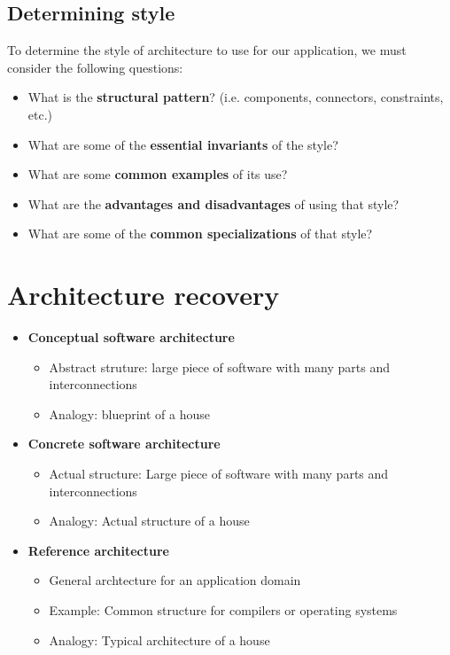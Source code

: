 \documentclass[12pt]{book}
\begin{document}
\subsection*{Determining style}
To determine the style of architecture to use for our application, we must consider the following questions:

\begin{itemize}
  \item What is the \textbf{structural pattern}? (i.e. components, connectors, constraints, etc.)
  \item What are some of the \textbf{essential invariants} of the style? 
  \item What are some \textbf{common examples} of its use?
  \item What are the \textbf{advantages and disadvantages} of using that style?
  \item What are some of the \textbf{common specializations} of that style?
\end{itemize}

\section*{Architecture recovery}

\begin{itemize}
  \item \textbf{Conceptual software architecture}
  \begin{itemize}
    \item Abstract struture: large piece of software with many parts and interconnections
    \item Analogy: blueprint of a house
  \end{itemize} 

  \item \textbf{Concrete software architecture}
  \begin{itemize}
    \item Actual structure: Large piece of software with many parts and interconnections
    \item Analogy: Actual structure of a house
  \end{itemize} 

  \item \textbf{Reference architecture}
  \begin{itemize}
    \item General archtecture for an application domain
    \item Example: Common structure for compilers or operating systems
    \item Analogy: Typical architecture of a house
  \end{itemize} 
\end{itemize}
\end{document}
